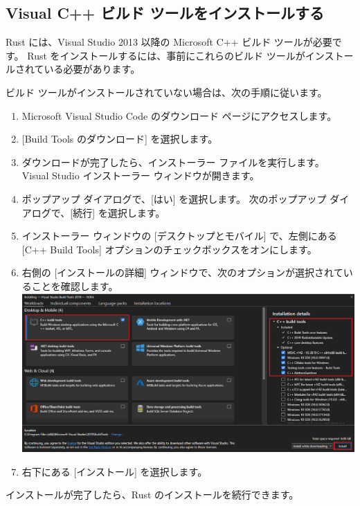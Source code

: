\subsection{Visual C++ ビルド ツールをインストールする}

Rust には、Visual Studio 2013 以降の Microsoft C++ ビルド ツールが必要です。 Rust をインストールするには、事前にこれらのビルド ツールがインストールされている必要があります。

ビルド ツールがインストールされていない場合は、次の手順に従います。


\begin{enumerate}
\item Microsoft Visual Studio Code のダウンロード ページにアクセスします。

\item $[$Build Tools のダウンロード] を選択します。

\item ダウンロードが完了したら、インストーラー ファイルを実行します。 Visual Studio インストーラー ウィンドウが開きます。

\item ポップアップ ダイアログで、[はい] を選択します。 次のポップアップ ダイアログで、[続行] を選択します。

\item インストーラー ウィンドウの [デスクトップとモバイル] で、左側にある [C++ Build Tools] オプションのチェックボックスをオンにします。

\item 右側の [インストールの詳細] ウィンドウで、次のオプションが選択されていることを確認します。
\includegraphics[width=14cm]{install-visual-cpp-build-tools.eps}

\item 右下にある [インストール] を選択します。
\end{enumerate}

インストールが完了したら、Rust のインストールを続行できます。
